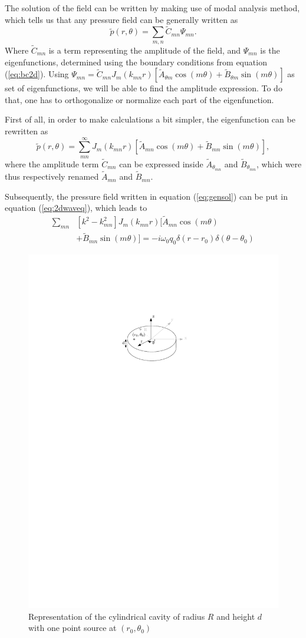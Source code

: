 \documentclass[%
 reprint,
 amsmath,amssymb,
 aip,
]{revtex4-1}
\begin{document}
The solution of the field can be written by making use of modal analysis method, which tells us that any pressure field can be generally written as 
\begin{equation}
    \tilde{p}(r, \theta) = \sum_{m,n} \tilde{C}_{mn} \Psi_{mn}.
\end{equation}
Where $\tilde{C}_{mn}$ is a term representing the amplitude of the field, and $\Psi_{mn}$ is the eigenfunctions, determined using the boundary conditions from equation (\ref{eq:bc2d}). Using $\Psi_{mn} = \tilde{C}_{mn} J_m (k_{mn}r)\left[ \tilde{A}_{\theta m} \cos(m \theta) + \tilde{B}_{\theta m} \sin(m \theta) \right]$ as set of eigenfunctions, we will be able to find the amplitude expression. To do that, one has to orthogonalize or normalize each part of the eigenfunction.

First of all, in order to make calculations a bit simpler, the eigenfunction can be rewritten as
\begin{equation}
        \tilde{p}(r, \theta) = \sum_{mn}^{\infty} J_m(k_{mn}r) \left[ \tilde{A}_{mn} \cos(m \theta) + \tilde{B}_{mn} \sin(m \theta) \right], \label{eq:gensol}
\end{equation}
where the amplitude term $\tilde{C}_{mn}$ can be expressed inside $\tilde{A}_{\theta_{mn}}$ and $\tilde{B}_{\theta_{mn}}$, which were thus respectively renamed $\tilde{A}_{mn}$ and $\tilde{B}_{mn}$. 

Subsequently, the pressure field written in equation (\ref{eq:gensol}) can be put in equation (\ref{eq:2dwaveq}), which leads to
\begin{equation}
    \begin{split}
        \sum_{mn} &\left[ k^2 - k_{mn}^2 \right] J_m(k_{mn}r) \Big[ \tilde{A}_{mn} \cos(m\theta) \\&+ \tilde{B}_{mn} \sin(m\theta) \Big]= - i \omega_0 q_0 \delta(r - r_0) \delta(\theta - \theta_0)
    \end{split} \label{eq:rawsol}
\end{equation}

\begin{figure}
    \centering
    \includegraphics[width=.35\textwidth]{figures/schema.pdf}
    \caption{Representation of the cylindrical cavity of radius $R$ and height $d$ with one point source at $(r_0, \theta_0)$}
    \label{fig:schema}
\end{figure}
\end{document}
